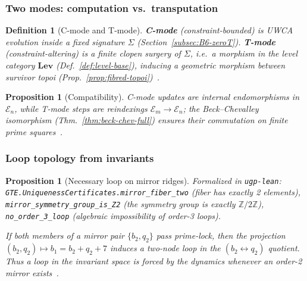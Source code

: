 \documentclass[12pt]{article}
\newtheorem{proposition}[theorem]{Proposition}
\newtheorem{definition}[theorem]{Definition}
\numberwithin{equation}{section}
\begin{document}
\subsubsection{Two modes: computation vs.\ transputation}\label{subsec:two-modes}
\begin{definition}[C-mode and T-mode]
\textbf{C-mode} (constraint-bounded) is UWCA evolution inside a fixed signature $\Sigma$ (Section~\ref{subsec:B6-zeroT}). \textbf{T-mode} (constraint-altering) is a finite clopen surgery of $\Sigma$, i.e.\ a morphism in the level category $\mathbf{Lev}$ (Def.~\ref{def:level-base}), inducing a geometric morphism between survivor topoi (Prop.~\ref{prop:fibred-topoi})~\cite{SpivackUGPFormalization,ugp-lean}.
\end{definition}
\begin{proposition}[Compatibility]
C-mode updates are internal endomorphisms in $\mathcal{E}_n$, while T-mode steps are reindexings $\mathcal{E}_m\to\mathcal{E}_n$; the Beck--Chevalley isomorphism (Thm.~\ref{thm:beck-chev-full}) ensures their commutation on finite prime squares~\cite{SpivackUGPFormalization,ugp-lean}.
\end{proposition}

\subsubsection{Loop topology from invariants}\label{subsec:loop-topology}
\begin{proposition}[Necessary loop on mirror ridges]\label{prop:loop}
\noindent\emph{Formalized in} \texttt{ugp-lean}: \texttt{GTE.UniquenessCertificates.mirror\_fiber\_two} (fiber has exactly 2 elements), \texttt{mirror\_symmetry\_group\_is\_Z2} (the symmetry group is exactly $\mathbb{Z}/2\mathbb{Z}$), \texttt{no\_order\_3\_loop} (algebraic impossibility of order-3 loops).

If both members of a mirror pair $\{b_2,q_2\}$ pass prime-lock, then the projection $(b_2,q_2)\mapsto b_1=b_2+q_2+7$ induces a two-node loop in the $(b_2\!\leftrightarrow\!q_2)$ quotient. Thus a loop in the invariant space is forced by the dynamics whenever an order-2 mirror exists~\cite{SpivackUGPFormalization,ugp-lean}.
\end{proposition}
\end{document}
